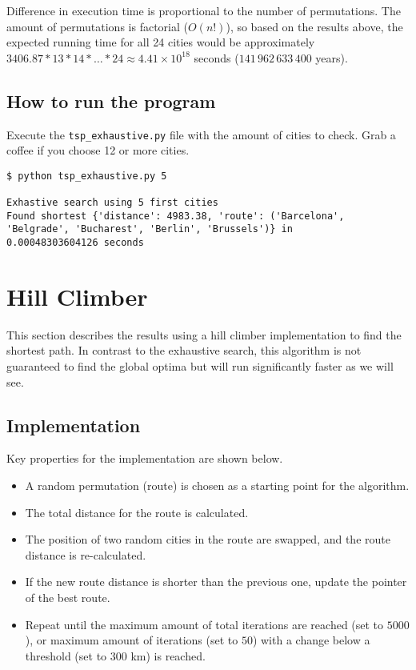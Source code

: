 \documentclass{article}
\begin{document}
\noindent Difference in execution time is proportional to the number of permutations. The amount of permutations is factorial ($O(n!)$), so based on the results above, the expected running time for all 24 cities would be approximately $3406.87 * 13 * 14 * \ldots * 24 \approx 4.41 \times 10^{18}$ seconds ($141\,962\,633\,400$ years).

\subsection*{How to run the program}

Execute the \texttt{tsp\_exhaustive.py} file with the amount of cities to check. Grab a coffee if you choose 12 or more cities.

\begin{verbatim}
$ python tsp_exhaustive.py 5

Exhastive search using 5 first cities
Found shortest {'distance': 4983.38, 'route': ('Barcelona',
'Belgrade', 'Bucharest', 'Berlin', 'Brussels')} in
0.00048303604126 seconds
\end{verbatim}

\section*{Hill Climber}

This section describes the results using a hill climber implementation to find the shortest path. In contrast to the exhaustive search, this algorithm is not guaranteed to find the global optima but will run significantly faster as we will see.

\subsection*{Implementation}

Key properties for the implementation are shown below.

\begin{itemize}
    \item A random permutation (route) is chosen as a starting point for the algorithm.
    \item The total distance for the route is calculated.
    \item The position of two random cities in the route are swapped, and the route distance is re-calculated.
    \item If the new route distance is shorter than the previous one, update the pointer of the best route.
    \item Repeat until the maximum amount of total iterations are reached (set to $5000$), or maximum amount of iterations (set to $50$) with a change below a threshold (set to $300$ km) is reached.
\end{itemize}
\end{document}
